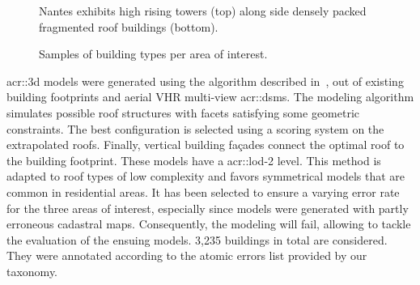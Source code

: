 \begin{figure}[htpb]
{\begin{subfloatrow}[3]
{                    }{
                        \caption{
                            \label{subfig::nantes_samples}
                            Nantes exhibits high rising towers (top) along side densely packed fragmented roof buildings (bottom).
                        }
                    }
                \end{subfloatrow}
            }{
                \caption{
                    \label{fig::samples}
                    Samples of building types per area of interest.
                }
            }
        \end{figure}

        \gls{acr::3d} models were generated using the algorithm described in~\parencite{durupt2006automatic}, out of existing building footprints and aerial VHR multi-view \glspl{acr::dsm}.
        The modeling algorithm simulates possible roof structures with facets satisfying some geometric constraints.
        The best configuration is selected using a scoring system on the extrapolated roofs.
        Finally, vertical building fa\c{c}ades connect the optimal roof to the building footprint.
        These models have a \gls{acr::lod}-2 level.
        This method is adapted to roof types of low complexity and favors symmetrical models that are common in residential areas.
        It has been selected to ensure a varying error rate for the three areas of interest, especially since models were generated with partly erroneous cadastral maps.
        Consequently, the modeling will fail, allowing to tackle the evaluation of the ensuing models.
        3,235 buildings in total are considered.
        They were annotated according to the atomic errors list provided by our taxonomy.

